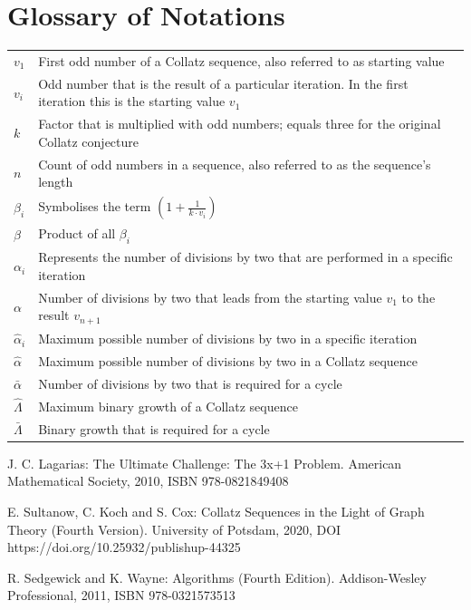 \documentclass{SciPress_2015}
\begin{document}
\section{Glossary of Notations}
\label{appx:glossary_of_notations}
\vspace{-1em}
\begin{table}[H]
	\centering
	\setlength{\tabcolsep}{1,2em}\setlength\extrarowheight{3pt}
	\begin{tabular}{|l|p{13.5cm}|}
		\hline
		\thead{\textbf{Notation}} &
		\thead{\textbf{Description}}\\
		\hline
		$v_1$ &
		First odd number of a Collatz sequence, also referred to as starting value\\
		\hline
		$v_i$ &
		Odd number that is the result of a particular iteration. In the first iteration this is the starting value $v_1$\\
		\hline
		$k$ &
		Factor that is multiplied with odd numbers; equals three for the original Collatz conjecture\\
		\hline
		$n$ &
		Count of odd numbers in a sequence, also referred to as the sequence's length\\
		\hline
		$\beta_i$ &
		Symbolises the term $\left(1+\frac{1}{k\cdot v_i}\right)$\\
		\hline
		$\beta$ &
		Product of all $\beta_i$\\
		\hline
		$\alpha_i$ &
		Represents the number of divisions by two that are performed in a specific iteration\\
		\hline
		$\alpha$ &
		Number of divisions by two that leads from the starting value $v_1$ to the result $v_{n+1}$\\
		\hline
		$\hat\alpha_i$ &
		Maximum possible number of divisions by two in a specific iteration\\
		\hline
		$\hat\alpha$ &
		Maximum possible number of divisions by two in a Collatz sequence\\
		\hline
		$\bar\alpha$ &
		Number of divisions by two that is required for a cycle\\
		\hline
		$\hat\Lambda$ &
		Maximum binary growth of a Collatz sequence\\
		\hline
		$\bar\Lambda$ &
		Binary growth that is required for a cycle\\
		\hline
	\end{tabular}
\end{table}


\newpage
\begin{thebibliography}{99}

J. C. Lagarias: The Ultimate Challenge: The 3x+1 Problem. American Mathematical Society, 2010, ISBN 978-0821849408

E. Sultanow, C. Koch and S. Cox: Collatz Sequences in the Light of Graph Theory (Fourth Version). University of Potsdam, 2020, DOI https://doi.org/10.25932/publishup-44325

R. Sedgewick and K. Wayne: Algorithms (Fourth Edition). Addison-Wesley Professional, 2011, ISBN 978-0321573513

\end{thebibliography}
\end{document}

